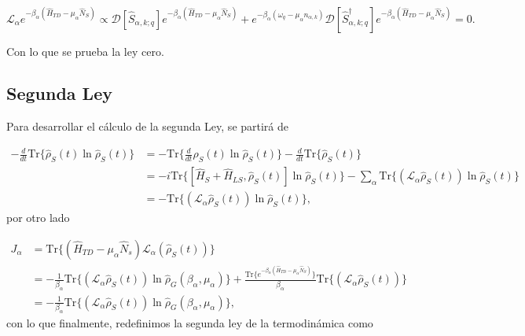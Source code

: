 \begin{appendixs}
\begin{equation*}
    \mathcal{L}_{\alpha}e^{-\beta_{\alpha}(\hat{H}_{TD} - \mu_{\alpha}\hat{N}_{S})} \propto  \mathcal{D}[\hat{S}_{\alpha,k;q}]e^{-\beta_{\alpha}(\hat{H}_{TD} - \mu_{\alpha}\hat{N}_{S})} + e^{-\beta_{\alpha}(\omega_{q} - \mu_{\alpha}n_{\alpha,k})}\mathcal{D}[\hat{S}^{\dagger}_{\alpha,k;q}]e^{-\beta_{\alpha}(\hat{H}_{TD} - \mu_{\alpha}\hat{N}_{S})} = 0.
\end{equation*}

Con lo que se prueba la ley cero.

\newpage


\subsection{Segunda Ley}
Para desarrollar el cálculo de la segunda Ley, se partirá de

\begin{align*}
    - \frac{d}{dt}\text{Tr}\{ \hat{\rho}_{S}(t)\ln \hat{\rho}_{S}(t) \} & =  -\text{Tr}\Big\{ \frac{d}{dt}\hat{\rho}_{S}(t)\ln \hat{\rho}_{S}(t) \Big\} - \frac{d}{dt}\text{Tr}\{\hat{\rho}_{S}(t) \}\\
  & = - i \text{Tr}\{[\hat{H}_{S}+\hat{H}_{LS},\hat{\rho}_{S}(t)]\ln \hat{\rho}_{S}(t)  \} - \sum_{\alpha} \text{Tr}\{(\mathcal{L}_{\alpha}\hat{\rho}_{S}(t)) \ln \hat{\rho}_{S}(t) \}  \\
  & = -\text{Tr}\{(\mathcal{L}_{\alpha}\hat{\rho}_{S}(t)) \ln \hat{\rho}_{S}(t) \},
\end{align*}
por otro lado

\begin{align*}
    J_{\alpha} & = \text{Tr}\{ (\hat{H}_{TD} - \mu_{\alpha}\hat{N}_{s})\mathcal{L}_{\alpha}(\hat{\rho}_{S}(t)) \} \\
    & = -\frac{1}{\beta_{\alpha}} \text{Tr}\{(\mathcal{L}_{\alpha}\hat{\rho}_{S}(t)) \ln \hat{\rho}_{G}(\beta_{\alpha},\mu_{\alpha})  \} + \frac{\text{Tr}\{e^{-\beta_{\alpha}(\hat{H}_{TD} - \mu_{\alpha}\hat{N}_{S})} \} }{\beta_{\alpha}} \text{Tr}\{(\mathcal{L}_{\alpha}\hat{\rho}_{S}(t)) \} \\
    & = -\frac{1}{\beta_{\alpha}} \text{Tr}\{(\mathcal{L}_{\alpha}\hat{\rho}_{S}(t))\ln \hat{\rho}_{G}(\beta_{\alpha},\mu_{\alpha})  \},
\end{align*}
con lo que finalmente, redefinimos la segunda ley de la termodinámica como


\end{appendixs}
